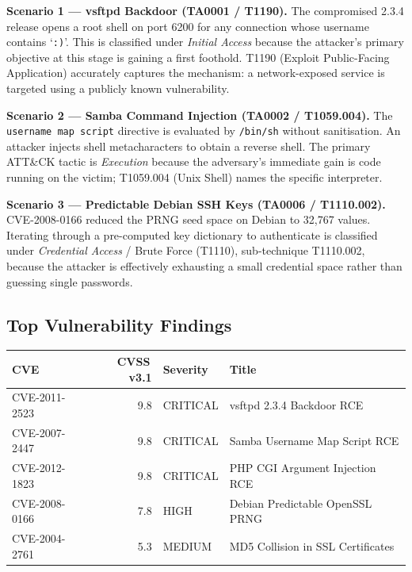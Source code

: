 \documentclass[11pt,a4paper]{article}
\begin{document}
\vspace{6pt}
\noindent\textbf{Scenario 1 --- vsftpd Backdoor (TA0001 / T1190).}
The compromised 2.3.4 release opens a root shell on port 6200 for any connection whose
username contains `\texttt{:)}'.  This is classified under \emph{Initial Access} because
the attacker's primary objective at this stage is gaining a first foothold.  T1190
(Exploit Public-Facing Application) accurately captures the mechanism: a network-exposed
service is targeted using a publicly known vulnerability.

\noindent\textbf{Scenario 2 --- Samba Command Injection (TA0002 / T1059.004).}
The \texttt{username~map~script} directive is evaluated by \texttt{/bin/sh} without
sanitisation.  An attacker injects shell metacharacters to obtain a reverse shell.
The primary ATT\&CK tactic is \emph{Execution} because the adversary's immediate gain
is code running on the victim; T1059.004 (Unix Shell) names the specific interpreter.

\noindent\textbf{Scenario 3 --- Predictable Debian SSH Keys (TA0006 / T1110.002).}
CVE-2008-0166 reduced the PRNG seed space on Debian to 32,767 values.  Iterating through
a pre-computed key dictionary to authenticate is classified under \emph{Credential Access}
/ Brute Force (T1110), sub-technique T1110.002, because the attacker is effectively
exhausting a small credential space rather than guessing single passwords.

\subsection{Top Vulnerability Findings}

\small
\begin{tabularx}{\linewidth}{>{\ttfamily}l r l >{\raggedright\arraybackslash}X}
\toprule
\normalfont CVE & CVSS\,v3.1 & Severity & Title \\
\midrule
CVE-2011-2523 & 9.8 & CRITICAL & vsftpd 2.3.4 Backdoor RCE \\
CVE-2007-2447 & 9.8 & CRITICAL & Samba Username Map Script RCE \\
CVE-2012-1823 & 9.8 & CRITICAL & PHP CGI Argument Injection RCE \\
CVE-2008-0166 & 7.8 & HIGH     & Debian Predictable OpenSSL PRNG \\
CVE-2004-2761 & 5.3 & MEDIUM   & MD5 Collision in SSL Certificates \\
\bottomrule
\end{tabularx}
\normalsize
\end{document}
